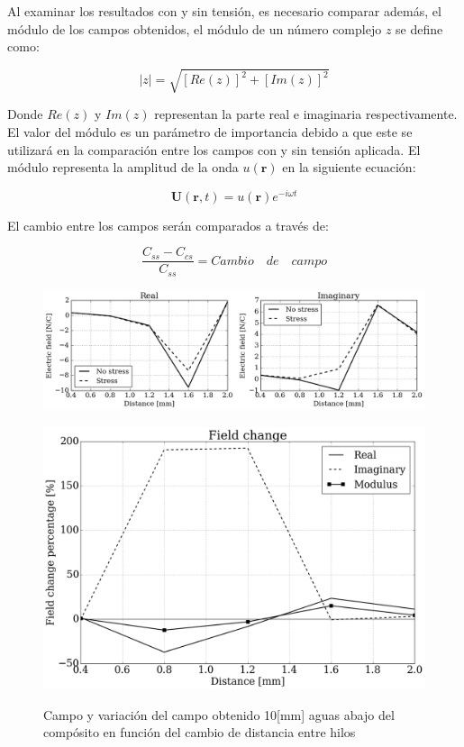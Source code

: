 \documentclass[12pt,letterpaper]{article}
\numberwithin{equation}{section}
\begin{document}
Al examinar los resultados con y sin tensión, es necesario comparar además, el módulo de los campos obtenidos, el módulo de un número complejo $z$ se define como:

$$|z| = \sqrt{\left[Re(z)\right]^2+\left[Im(z)\right]^2}$$

Donde $Re(z)$ y $Im(z)$ representan la parte real e imaginaria respectivamente. El valor del módulo es un parámetro de importancia debido a que este se utilizará en la comparación entre los campos con y sin tensión aplicada. El módulo representa la amplitud de la onda $u(\textbf{r})$ en la siguiente ecuación:

$$\textbf{U}(\textbf{r},t) = u(\textbf{r})e^{-i\omega t}$$ 

El cambio entre los campos serán comparados a través de:

$$\frac{C_{ss}-C_{cs}}{C_{ss}} = Cambio\quad de\quad campo$$

\begin{figure}[H]
	\centering\includegraphics[scale=0.6]{Imagenes/field_screen_comparision.png}\\
\end{figure} 
\begin{figure}[H]
	\centering\includegraphics[scale=0.35]{Imagenes/field_change.png}\\
	\caption{Campo y variación del campo obtenido 10[mm] aguas abajo del compósito en función del cambio de distancia entre hilos}
	\label{fig:field_change}
\end{figure}
 
\end{document}
